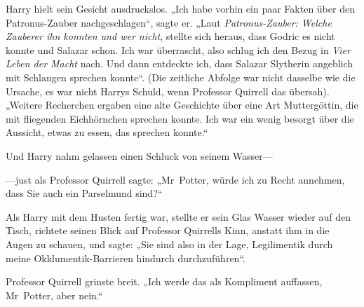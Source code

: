 Harry hielt sein Gesicht ausdruckslos. „Ich habe vorhin ein paar Fakten über den Patronus-Zauber nachgeschlagen“, sagte er. „Laut \emph{Patronus-Zauber: Welche Zauberer ihn konnten und wer nicht}, stellte sich heraus, dass Godric es nicht konnte und Salazar schon. Ich war überrascht, also schlug ich den Bezug in \emph{Vier Leben der Macht} nach. Und dann entdeckte ich, dass Salazar Slytherin angeblich mit Schlangen sprechen konnte“. (Die zeitliche Abfolge war nicht dasselbe wie die Ursache, es war nicht Harrys Schuld, wenn Professor Quirrell das übersah). „Weitere Recherchen ergaben eine alte Geschichte über eine Art Muttergöttin, die mit fliegenden Eichhörnchen sprechen konnte. Ich war ein wenig besorgt über die Aussicht, etwas zu essen, das sprechen konnte.“

Und Harry nahm gelassen einen Schluck von seinem Wasser—

—just als Professor Quirrell sagte: „Mr~Potter, würde ich zu Recht annehmen, dass Sie auch ein Parselmund sind?“

Als Harry mit dem Husten fertig war, stellte er sein Glas Wasser wieder auf den Tisch, richtete seinen Blick auf Professor Quirrells Kinn, anstatt ihm in die Augen zu schauen, und sagte: „Sie sind also in der Lage, Legilimentik durch meine Okklumentik-Barrieren hindurch durchzuführen“.

Professor Quirrell grinste breit. „Ich werde das als Kompliment auffassen, Mr~Potter, aber nein.“

